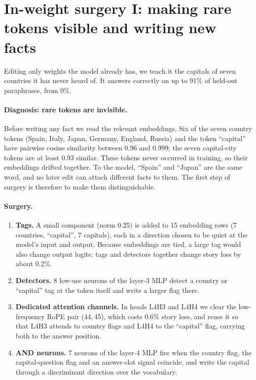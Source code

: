 \documentclass[11pt]{article}
\begin{document}
\section{In-weight surgery I: making rare tokens visible and writing new facts}\label{sec:facts}
Editing only weights the model already has, we teach it the capitals of seven countries it has never heard of. It answers correctly on up to 91\% of held-out paraphrases, from 0\%.

\paragraph{Diagnosis: rare tokens are invisible.} Before writing any fact we read the relevant embeddings. Six of the seven country tokens (Spain, Italy, Japan, Germany, England, Russia) and the token ``capital'' have pairwise cosine similarity between 0.96 and 0.999; the seven capital-city tokens are at least 0.93 similar. These tokens never occurred in training, so their embeddings drifted together. To the model, ``Spain'' and ``Japan'' are the same word, and no later edit can attach different facts to them. The first step of surgery is therefore to make them distinguishable.

\paragraph{Surgery.}
\begin{enumerate}[leftmargin=*]
\item \textbf{Tags.} A small component (norm 0.25) is added to 15 embedding rows (7 countries, ``capital'', 7 capitals), each in a direction chosen to be quiet at the model's input and output. Because embeddings are tied, a large tag would also change output logits; tags and detectors together change story loss by about 0.2\%.
\item \textbf{Detectors.} 8 low-use neurons of the layer-3 MLP detect a country or ``capital'' tag at the token itself and write a larger flag there.
\item \textbf{Dedicated attention channels.} In heads L4H3 and L4H4 we clear the low-frequency RoPE pair (44,\,45), which costs 0.6\% story loss, and reuse it so that L4H3 attends to country flags and L4H4 to the ``capital'' flag, carrying both to the answer position.
\item \textbf{AND neurons.} 7 neurons of the layer-4 MLP fire when the country flag, the capital-question flag and an answer-slot signal coincide, and write the capital through a discriminant direction over the vocabulary.
\end{enumerate}
\end{document}
